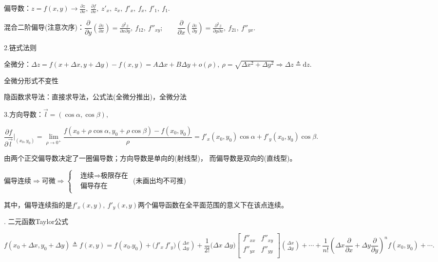 \documentclass[UTF8]{ctexart}
\newcommand\dif{\mathrm{d}}
\newcommand\no{\noindent}
\newcommand\dis{\displaystyle}
\newcommand\limit{\dis\lim\limits}
\newcommand\pzx{\dis\frac{\partial z}{\partial x}}
\newcommand\pzy{\dis\frac{\partial z}{\partial y}}
\newcommand\pfx{\dis\frac{\partial f}{\partial x}}
\newcommand\pzxy{\dis\frac{\partial^2 z}{\partial x\partial y}}
\newcommand\pzyx{\dis\frac{\partial^2 z}{\partial y\partial x}}
\begin{document}
\begin{spacing}{2}
\begin{spacing}{2.5}

\no 偏导数：$z=f(x,y)\longrightarrow\pzx,\ \pfx,\ z'_x,\ z_x,\ f'_x,\ f_x,\ f'_1,\ f_1.$

\end{spacing}

\no 混合二阶偏导(注意次序)：$\dfrac{\partial}{\partial y}\left(\pzx\right)=\pzxy,
\ f_{12},\ f''_{xy};
\qquad\dfrac{\partial}{\partial x}\left(\pzy\right)=\pzyx,\ f_{21},\ f''_{yx}.$

\no2.链式法则

\no 全微分：$\dis\Delta z=f(x+\Delta x,y+\Delta y)-f(x,y)=A\Delta x+B\Delta y+o(\rho),\ 
\rho=\sqrt{\Delta x^2+\Delta y^2}\Rightarrow\Delta z\triangleq\dif z.$

\no 全微分形式不变性

\no 隐函数求导法：直接求导法，公式法(全微分推出)，全微分法

\no3.方向导数：$\stackrel{\rightarrow}{l}=(\cos\alpha,\cos\beta),$

$\dfrac{\partial f}{\partial \stackrel{\rightarrow}{l}}\Bigg|_{(x_0,y_0)}=
\limit_{\rho\to0^+}\dfrac{f(x_0+\rho\cos\alpha,y_0+\rho\cos\beta)-f(x_0,y_0)}{\rho}
=f'_x(x_0,y_0)\cos\alpha+f'_y(x_0,y_0)\cos\beta.$

\vspace{0.3cm}

由两个正交偏导数决定了一圈偏导数；方向导数是单向的(射线型)，
而偏导数是双向的(直线型)。

\vspace{0.3cm}

偏导连续$\Longrightarrow$可微$\Longrightarrow\left\{\begin{aligned}
&\text{连续}\Longrightarrow\text{极限存在}\\
&\text{偏导存在}\\
\end{aligned}\right.$
(未画出均不可推)

\vspace{0.3cm}

其中，偏导连续指的是$f'_x(x,y),\ f'_y(x,y)$两个偏导函数在全平面范围的意义下在该点连续。

\no4. \textcolor[rgb]{1,0,0}{二元函数Taylor公式}

$\dis f(x_0+\Delta x,y_0+\Delta y)\triangleq f(x,y)=
f(x_0.y_0)+\big(f'_x\ f'_y\big)
\binom{\Delta x}{\Delta y}
+\dfrac{1}{2!}\big(\Delta x\ \Delta y\big)
\left[          
  \begin{array}{cc}   
    f''_{xx} & f''_{xy} \\  
    f''_{yx} &f''_{yy} \\  
  \end{array}
\right]               
\binom{\Delta x}{\Delta y}
+\cdots+
\dfrac{1}{n!}\left(\Delta x\dfrac{\partial}{\partial x}
+\Delta y\dfrac{\partial}{\partial y}\right)^nf(x_0,y_0)+\cdots.$


\end{spacing}
\end{document}
